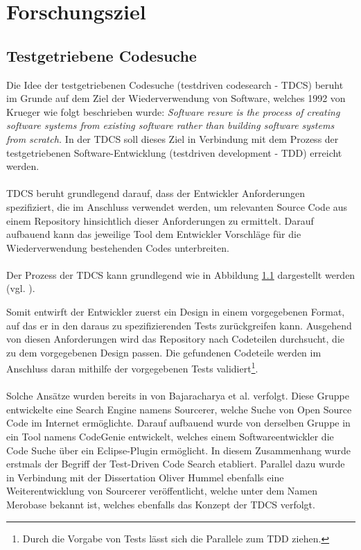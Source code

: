 \chapter{Forschungsziel}
\section{Testgetriebene Codesuche}
Die Idee der testgetriebenen Codesuche (testdriven codesearch - TDCS) beruht im Grunde auf dem Ziel der Wiederverwendung von Software, welches 1992 von Krueger wie folgt beschrieben wurde:
\emph{\glqq Software resure is the process of creating software systems from existing software rather than building software systems from scratch.\grqq{}} \cite{krueger} In der TDCS soll dieses Ziel in Verbindung mit dem Prozess der testgetriebenen Software-Entwicklung (testdriven development - TDD) erreicht werden. \cite{hummel08} 
\\\\
TDCS beruht grundlegend darauf, dass der Entwickler Anforderungen spezifiziert, die im Anschluss verwendet werden, um relevanten Source Code aus einem Repository hinsichtlich dieser Anforderungen zu ermittelt. Darauf aufbauend kann das jeweilige Tool dem Entwickler Vorschläge für die Wiederverwendung bestehenden Codes unterbreiten.
\\\\
Der Prozess der TDCS kann grundlegend wie in Abbildung \ref{} dargestellt werden (vgl. \cite{hummel08}).
\begin{figure}[h!]

\end{figure}
Somit entwirft der Entwickler zuerst ein Design in einem vorgegebenen Format, auf das er in den daraus zu spezifizierenden Tests zurückgreifen kann. Ausgehend von diesen Anforderungen wird das Repository nach Codeteilen durchsucht, die zu dem vorgegebenen Design passen. Die gefundenen Codeteile werden im Anschluss daran mithilfe der vorgegebenen Tests validiert\footnote{Durch die Vorgabe von Tests lässt sich die Parallele zum TDD ziehen.}.
\\\\
Solche Ansätze wurden bereits in \cite{sourcerer} von Bajaracharya et al.  verfolgt. Diese Gruppe entwickelte eine Search Engine namens Sourcerer, welche Suche von Open Source Code im Internet ermöglichte. Darauf aufbauend wurde von derselben Gruppe in \cite{Lemos} ein Tool namens CodeGenie entwickelt, welches einem Softwareentwickler die Code Suche über ein Eclipse-Plugin ermöglicht. In diesem Zusammenhang wurde erstmals der Begriff der Test-Driven Code Search etabliert. Parallel dazu wurde in Verbindung mit der Dissertation Oliver Hummel \cite{hummel08} ebenfalls eine Weiterentwicklung von Sourcerer veröffentlicht, welche unter dem Namen Merobase bekannt ist, welches ebenfalls das Konzept der TDCS verfolgt.
